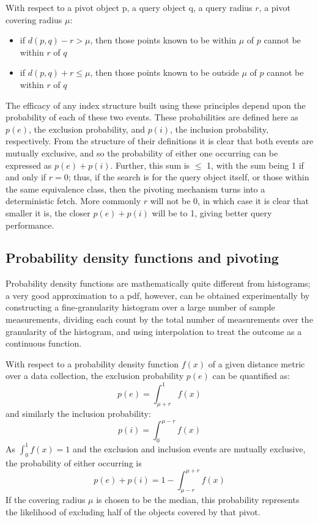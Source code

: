 With respect to a pivot object p, a query object q, a query radius $r$, a pivot covering radius $\mu$:
\begin{itemize}
\item if $d(p,q) - r > \mu$, then those points known to be within $\mu$ of $p$ cannot be within $r$ of $q$
\item if $d(p,q) + r \leq \mu$, then those points known to be outside $\mu$ of $p$ cannot be within $r$ of $q$
\end{itemize}

The efficacy of any index structure built using these principles depend upon the probability of each of these two events. These probabilities are defined here as $p(e)$, the exclusion probability, and $p(i)$, the inclusion probability, respectively. From the structure of their definitions it is clear that both events are mutually exclusive, and so the probability of either one occurring can be expressed as $p(e) + p(i)$. Further, this sum is $\leq$ 1, with the sum being 1 if and only if $r = 0$; thus, if the search is for the query object itself, or those within the same equivalence class, then the pivoting mechanism turns into a deterministic fetch. More commonly $r$ will not be $0$, in which case it is clear that smaller it is, the closer $p(e) + p(i)$ will be to 1, giving better query performance.

\subsection{Probability density functions and pivoting}
Probability density functions are mathematically quite different from histograms; a very good approximation to a pdf, however, can be obtained experimentally by constructing a fine-granularity histogram over a large number of sample measurements, dividing each count by the total number of measurements over the granularity of the histogram, and using interpolation to treat the outcome as a continuous function. 

With respect to a probability density function $f(x)$ of a given distance metric over a data collection, the exclusion probability $p(e)$ can be quantified as:
\begin{equation}
	p(e) = \int_{\mu + r}^1 f(x)
\end{equation}
and similarly the inclusion probability:
\begin{equation}
	p(i) = \int_0^{\mu - r} f(x)
\end{equation}
As $\int_0^1 f(x) = 1$ and the exclusion and inclusion events are mutually exclusive, the probability of either occurring is
\begin{equation}
	p(e) + p(i) = 1 - \int_{\mu - r}^{\mu + r} f(x)
\end{equation}
If the covering radius $\mu$ is chosen to be the median, this probability represents the likelihood of excluding half of the objects covered by that pivot.


